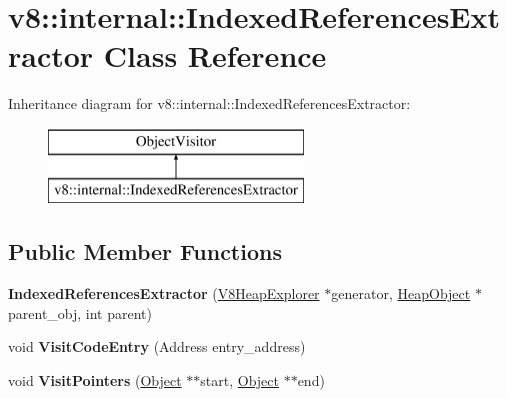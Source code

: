 \hypertarget{classv8_1_1internal_1_1_indexed_references_extractor}{}\section{v8\+:\+:internal\+:\+:Indexed\+References\+Extractor Class Reference}
\label{classv8_1_1internal_1_1_indexed_references_extractor}
Inheritance diagram for v8\+:\+:internal\+:\+:Indexed\+References\+Extractor\+:\begin{figure}[H]
\begin{center}
\leavevmode
\includegraphics[height=2.000000cm]{classv8_1_1internal_1_1_indexed_references_extractor}
\end{center}
\end{figure}
\subsection*{Public Member Functions}
\begin{DoxyCompactItemize}
\item 
\hypertarget{classv8_1_1internal_1_1_indexed_references_extractor_a97df6ae1d3126d4bb70ce2de2a3f295e}{}{\bfseries Indexed\+References\+Extractor} (\hyperlink{classv8_1_1internal_1_1_v8_heap_explorer}{V8\+Heap\+Explorer} $\ast$generator, \hyperlink{classv8_1_1internal_1_1_heap_object}{Heap\+Object} $\ast$parent\+\_\+obj, int parent)\label{classv8_1_1internal_1_1_indexed_references_extractor_a97df6ae1d3126d4bb70ce2de2a3f295e}

\item 
\hypertarget{classv8_1_1internal_1_1_indexed_references_extractor_a643bc7bf93a5f1b46b8b51e17f21c2cc}{}void {\bfseries Visit\+Code\+Entry} (Address entry\+\_\+address)\label{classv8_1_1internal_1_1_indexed_references_extractor_a643bc7bf93a5f1b46b8b51e17f21c2cc}

\item 
\hypertarget{classv8_1_1internal_1_1_indexed_references_extractor_aa4206c12ad999b1bbe69b37fee89ae75}{}void {\bfseries Visit\+Pointers} (\hyperlink{classv8_1_1internal_1_1_object}{Object} $\ast$$\ast$start, \hyperlink{classv8_1_1internal_1_1_object}{Object} $\ast$$\ast$end)\label{classv8_1_1internal_1_1_indexed_references_extractor_aa4206c12ad999b1bbe69b37fee89ae75}

\end{DoxyCompactItemize}
